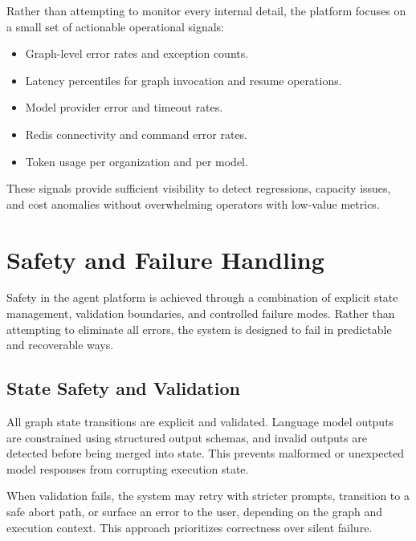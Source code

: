 Rather than attempting to monitor every internal detail, the platform focuses
on a small set of actionable operational signals:

\begin{itemize}
      \item Graph-level error rates and exception counts.
      \item Latency percentiles for graph invocation and resume operations.
      \item Model provider error and timeout rates.
      \item Redis connectivity and command error rates.
      \item Token usage per organization and per model.
\end{itemize}

These signals provide sufficient visibility to detect regressions, capacity
issues, and cost anomalies without overwhelming operators with low-value
metrics.

\section{Safety and Failure Handling}
\label{sec:SafetyFailure}

Safety in the agent platform is achieved through a combination of explicit
state management, validation boundaries, and controlled failure modes. Rather
than attempting to eliminate all errors, the system is designed to fail in
predictable and recoverable ways.

\subsection{State Safety and Validation}
\label{sec:StateSafety}

All graph state transitions are explicit and validated. Language model outputs
are constrained using structured output schemas, and invalid outputs are
detected before being merged into state. This prevents malformed or unexpected
model responses from corrupting execution state.

When validation fails, the system may retry with stricter prompts, transition
to a safe abort path, or surface an error to the user, depending on the graph
and execution context. This approach prioritizes correctness over silent
failure.


